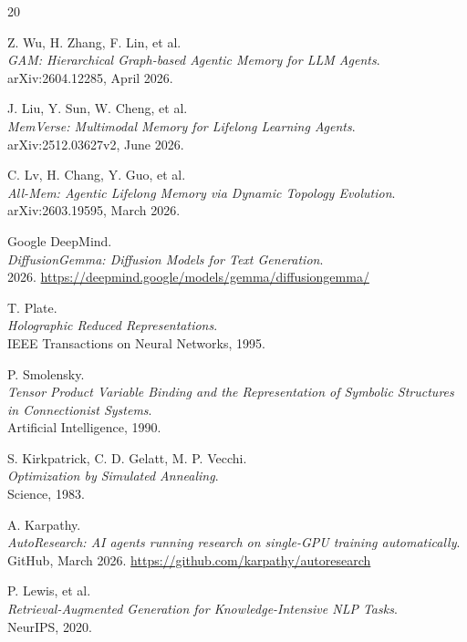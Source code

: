 \documentclass[11pt,a4paper]{article}
\begin{document}
\begin{thebibliography}{20}

Z. Wu, H. Zhang, F. Lin, et al.\\
\textit{GAM: Hierarchical Graph-based Agentic Memory for LLM Agents}.\\
arXiv:2604.12285, April 2026.

J. Liu, Y. Sun, W. Cheng, et al.\\
\textit{MemVerse: Multimodal Memory for Lifelong Learning Agents}.\\
arXiv:2512.03627v2, June 2026.

C. Lv, H. Chang, Y. Guo, et al.\\
\textit{All-Mem: Agentic Lifelong Memory via Dynamic Topology Evolution}.\\
arXiv:2603.19595, March 2026.

Google DeepMind.\\
\textit{DiffusionGemma: Diffusion Models for Text Generation}.\\
2026. \url{https://deepmind.google/models/gemma/diffusiongemma/}

T. Plate.\\
\textit{Holographic Reduced Representations}.\\
IEEE Transactions on Neural Networks, 1995.

P. Smolensky.\\
\textit{Tensor Product Variable Binding and the Representation of Symbolic Structures in Connectionist Systems}.\\
Artificial Intelligence, 1990.

S. Kirkpatrick, C. D. Gelatt, M. P. Vecchi.\\
\textit{Optimization by Simulated Annealing}.\\
Science, 1983.

A. Karpathy.\\
\textit{AutoResearch: AI agents running research on single-GPU training automatically}.\\
GitHub, March 2026. \url{https://github.com/karpathy/autoresearch}

P. Lewis, et al.\\
\textit{Retrieval-Augmented Generation for Knowledge-Intensive NLP Tasks}.\\
NeurIPS, 2020.


\end{thebibliography}
\end{document}
